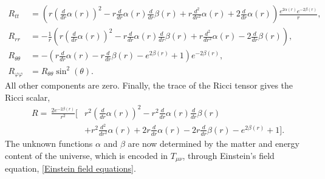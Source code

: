 \begin{align}
    R_{tt}
    & =
    \left(r \left(\frac{d}{d r} \alpha{\left(r \right)}\right)^{2} - r \frac{d}{d r} \alpha{\left(r \right)} \frac{d}{d r} \beta{\left(r \right)} + r \frac{d^{2}}{d r^{2}} \alpha{\left(r \right)} + 2 \frac{d}{d r} \alpha{\left(r \right)}
        \right)
    \frac{
         e^{2 \alpha{\left(r \right)}} e^{- 2 \beta{\left(r \right)}}}{r}, \\
    R_{rr}
    & =
    - \frac{1}{r}
    \left(
        r \left(\frac{d}{d r} \alpha{\left(r \right)}\right)^{2} - r \frac{d}{d r} \alpha{\left(r \right)} \frac{d}{d r} \beta{\left(r \right)} + r \frac{d^{2}}{d r^{2}} \alpha{\left(r \right)} - 2 \frac{d}{d r} \beta{\left(r \right)} 
    \right),\\
    R_{\theta \theta}
    &=
    - \left(r \frac{d}{d r} \alpha{\left(r \right)} - r \frac{d}{d r} \beta{\left(r \right)} - e^{2 \beta{\left(r \right)}} + 1\right) e^{- 2 \beta{\left(r \right)}}, \\
    R_{\varphi \varphi} & = R_{\theta \theta} \sin^2( \theta).
\end{align}
%
All other components are zero.
Finally, the trace of the Ricci tensor gives the Ricci scalar,
%
\begin{align}
    \nonumber
    R =
    \, \frac{2 e^{- 2 \beta{\left(r \right)}}}{r^{2}}
    \bigg[
        &
        r^{2} \left(\frac{d}{d r} \alpha{\left(r \right)}\right)^{2} 
        - r^{2} \frac{d}{d r} \alpha{\left(r \right)} \frac{d}{d r} \beta{\left(r \right)}
        \\ &
        + r^{2} \frac{d^{2}}{d r^{2}} \alpha{\left(r \right)} 
        + 2 r \frac{d}{d r} \alpha{\left(r \right)} 
        - 2 r \frac{d}{d r} \beta{\left(r \right)} - e^{2 \beta{\left(r \right)}} + 1
    \bigg].
\end{align}
%
 The unknown functions $\alpha$ and $\beta$ are now determined by the matter and energy content of the universe, which is encoded in $T_{\mu \nu}$, through Einstein's field equation, \autoref{Einstein field equations}. 
